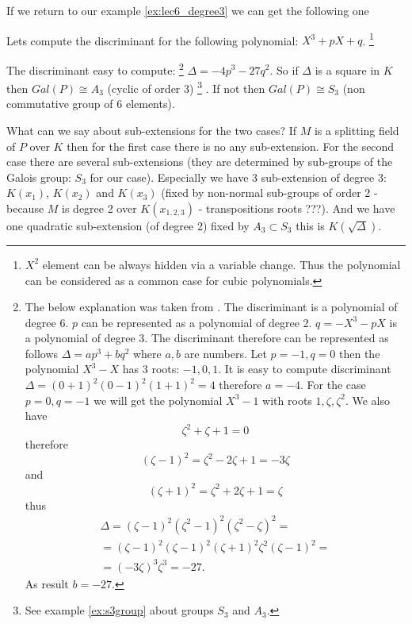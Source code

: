 If we return to our example \ref{ex:lec6_degree3} we can get the
following one
\begin{example}
  Lets compute the discriminant for the following polynomial:
  $X^3 + p X + q$.
  \footnote {
    $X^2$ element can be always hidden via a variable change. Thus the
    polynomial can be considered as a common case for cubic polynomials.
  }

  The discriminant easy to compute:
  \footnote{
    The below explanation was taken from
    \cite{mathstackexchange:discriminant3}. 
    The discriminant is a polynomial of degree 6. $p$ can be
    represented as a polynomial of degree 2. $q = - X^3 - p X$ is a
    polynomial of degree 3. The discriminant therefore can be
    represented as follows $\Delta = a p^3 + b q^2$ where $a,b$ are
    numbers. Let $p = -1, q = 0$ then the polynomial $X^3 - X$ has 3
    roots: $-1, 0, 1$. It is easy to compute discriminant
    $\Delta = (0 + 1)^2(0 - 1)^2(1+1)^2 = 4$ therefore $a =  -4$.
    For the case $p = 0, q = -1$ we will get the polynomial $X^3 - 1$
    with roots $1, \zeta, \zeta^2$. We also have
    \[
    \zeta^2 + \zeta + 1 = 0
    \]
    therefore
    \[
    \left(\zeta - 1\right)^2 = \zeta^2 - 2 \zeta + 1 = - 3 \zeta
    \]
    and
    \[
    \left(\zeta + 1\right)^2 = \zeta^2 + 2 \zeta + 1 =  \zeta
    \]    
    thus
    \begin{eqnarray}
    \Delta = \left(\zeta - 1\right)^2\left(\zeta^2 -
    1\right)^2\left(\zeta^2 - \zeta\right)^2 =
    \nonumber \\
    = \left(\zeta - 1\right)^2 \left(\zeta - 1\right)^2
    \left(\zeta + 1\right)^2 \zeta^2 \left(\zeta - 1\right)^2 =
    \nonumber \\
    = \left(- 3 \zeta\right)^3 \zeta^3 = -27.
    \nonumber
    \end{eqnarray}
    As result $b=-27$.
  }
  \(
  \Delta = -4 p^3 - 27 q^2
  \).
  So if $\Delta$ is a square in $K$ then $Gal\left(P\right) \cong A_3$
  (cyclic of order 3)
  \footnote{
    See example \ref{ex:s3group} about groups $S_3$ and
     $A_3$.
  }
  . If not then $Gal\left(P\right) \cong S_3$ (non
  commutative group of 6 elements).

  What can we say about sub-extensions for the two cases? If $M$ is a
  splitting field of $P$ over $K$ then for the first case there is no
  any sub-extension. For the second case there are several
  sub-extensions (they are determined by sub-groups of the Galois
  group: $S_3$ for our case). Especially we have 3 sub-extension of
  degree 3: $K\left(x_1\right)$, $K\left(x_2\right)$ and
  $K\left(x_3\right)$ (fixed by non-normal sub-groups of order 2 -
  because $M$ is degree 2 over $K\left(x_{1,2,3}\right)$ -
  transpositions roots ???). And we have one quadratic sub-extension
  (of degree 2) fixed by $A_3 \subset S_3$ this is
  $K\left(\sqrt{\Delta}\right)$.


\end{example}
